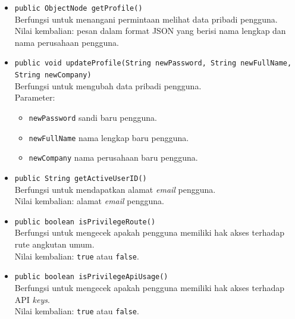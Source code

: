 \begin{itemize}
	\item \texttt{public ObjectNode getProfile()}\\
	Berfungsi untuk menangani permintaan melihat data pribadi pengguna.\\
	Nilai kembalian: pesan dalam format JSON yang berisi nama lengkap dan nama perusahaan pengguna.
	\item \texttt{public void updateProfile(String newPassword, String newFullName, String newCompany)}\\
	Berfungsi untuk mengubah data pribadi pengguna.\\
	Parameter:
	\begin{itemize}
		\item \texttt{newPassword} sandi baru pengguna.
		\item \texttt{newFullName} nama lengkap baru pengguna.
		\item \texttt{newCompany} nama perusahaan baru pengguna.
	\end{itemize}
	\item \texttt{public String getActiveUserID()}\\
	Berfungsi untuk mendapatkan alamat \textit{email} pengguna.\\
	Nilai kembalian: alamat \textit{email} pengguna.
	\item \texttt{public boolean isPrivilegeRoute()}\\
	Berfungsi untuk mengecek apakah pengguna memiliki hak akses terhadap rute angkutan umum.\\
	Nilai kembalian: \texttt{true} atau \texttt{false}.
	\item \texttt{public boolean isPrivilegeApiUsage()}\\
	Berfungsi untuk mengecek apakah pengguna memiliki hak akses terhadap API \textit{keys}.\\
	Nilai kembalian: \texttt{true} atau \texttt{false}.
\end{itemize}

